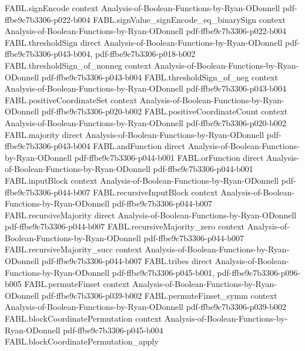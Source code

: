 \begin{theorem}
  {FABL.signEncode}
  {context}
  {Analysis-of-Boolean-Functions-by-Ryan-ODonnell}
  {pdf-ffbe9c7b3306-p022-b004}
\proofstep
  {FABL.signValue_signEncode_eq_binarySign}
  {context}
  {Analysis-of-Boolean-Functions-by-Ryan-ODonnell}
  {pdf-ffbe9c7b3306-p022-b004}
\proofstep
  {FABL.thresholdSign}
  {direct}
  {Analysis-of-Boolean-Functions-by-Ryan-ODonnell}
  {pdf-ffbe9c7b3306-p043-b004,
    pdf-ffbe9c7b3306-p018-b002}
\proofstep
  {FABL.thresholdSign_of_nonneg}
  {context}
  {Analysis-of-Boolean-Functions-by-Ryan-ODonnell}
  {pdf-ffbe9c7b3306-p043-b004}
\proofstep
  {FABL.thresholdSign_of_neg}
  {context}
  {Analysis-of-Boolean-Functions-by-Ryan-ODonnell}
  {pdf-ffbe9c7b3306-p043-b004}
\proofstep
  {FABL.positiveCoordinateSet}
  {context}
  {Analysis-of-Boolean-Functions-by-Ryan-ODonnell}
  {pdf-ffbe9c7b3306-p020-b002}
\proofstep
  {FABL.positiveCoordinateCount}
  {context}
  {Analysis-of-Boolean-Functions-by-Ryan-ODonnell}
  {pdf-ffbe9c7b3306-p020-b002}
\proofstep
  {FABL.majority}
  {direct}
  {Analysis-of-Boolean-Functions-by-Ryan-ODonnell}
  {pdf-ffbe9c7b3306-p043-b004}
\proofstep
  {FABL.andFunction}
  {direct}
  {Analysis-of-Boolean-Functions-by-Ryan-ODonnell}
  {pdf-ffbe9c7b3306-p044-b001}
\proofstep
  {FABL.orFunction}
  {direct}
  {Analysis-of-Boolean-Functions-by-Ryan-ODonnell}
  {pdf-ffbe9c7b3306-p044-b001}
\proofstep
  {FABL.inputBlock}
  {context}
  {Analysis-of-Boolean-Functions-by-Ryan-ODonnell}
  {pdf-ffbe9c7b3306-p044-b007}
\proofstep
  {FABL.recursiveInputBlock}
  {context}
  {Analysis-of-Boolean-Functions-by-Ryan-ODonnell}
  {pdf-ffbe9c7b3306-p044-b007}
\proofstep
  {FABL.recursiveMajority}
  {direct}
  {Analysis-of-Boolean-Functions-by-Ryan-ODonnell}
  {pdf-ffbe9c7b3306-p044-b007}
\proofstep
  {FABL.recursiveMajority_zero}
  {context}
  {Analysis-of-Boolean-Functions-by-Ryan-ODonnell}
  {pdf-ffbe9c7b3306-p044-b007}
\proofstep
  {FABL.recursiveMajority_succ}
  {context}
  {Analysis-of-Boolean-Functions-by-Ryan-ODonnell}
  {pdf-ffbe9c7b3306-p044-b007}
\proofstep
  {FABL.tribes}
  {direct}
  {Analysis-of-Boolean-Functions-by-Ryan-ODonnell}
  {pdf-ffbe9c7b3306-p045-b001,
    pdf-ffbe9c7b3306-p096-b005}
\proofstep
  {FABL.permuteFinset}
  {context}
  {Analysis-of-Boolean-Functions-by-Ryan-ODonnell}
  {pdf-ffbe9c7b3306-p039-b002}
\proofstep
  {FABL.permuteFinset_symm}
  {context}
  {Analysis-of-Boolean-Functions-by-Ryan-ODonnell}
  {pdf-ffbe9c7b3306-p039-b002}
\proofstep
  {FABL.blockCoordinatePermutation}
  {context}
  {Analysis-of-Boolean-Functions-by-Ryan-ODonnell}
  {pdf-ffbe9c7b3306-p045-b004}
\proofstep
  {FABL.blockCoordinatePermutation_apply}

\end{theorem}
